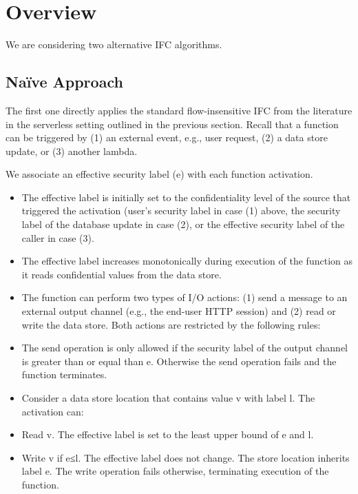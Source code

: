 \section{Overview} %
\label{sec:overview}
We are considering two alternative IFC algorithms.

\subsection{Na\"ive Approach} %
\label{sub:naive_approach}

The first one directly applies the standard flow-insensitive IFC from the literature in the serverless setting outlined in the previous section. Recall that a function can be triggered by (1) an external event, e.g., user request, (2) a data store update, or (3) another lambda.

We associate an effective security label (e) with each function activation.
\begin{itemize}
    \item The effective label is initially set to the confidentiality level of the source that triggered the activation (user's security label in case (1) above, the security label of the database update in case (2), or the effective security label of the caller in case (3).

    \item The effective label increases monotonically during execution of the function as it reads confidential values from the data store.

    \item The function can perform two types of I/O actions: (1) send a message to an external output channel (e.g., the end-user HTTP session) and (2) read or write the data store. Both actions are restricted by the following rules:

    \item The send operation is only allowed if the security label of the output channel is greater than or equal than e. Otherwise the send operation fails and the function terminates.

    \item Consider a data store location that contains value v with label l. The activation can:

    \item Read v. The effective label is set to the least upper bound of e and l.

    \item Write v if e≤l. The effective label does not change. The store location inherits label e. The write operation fails otherwise, terminating execution of the function.
\end{itemize}

